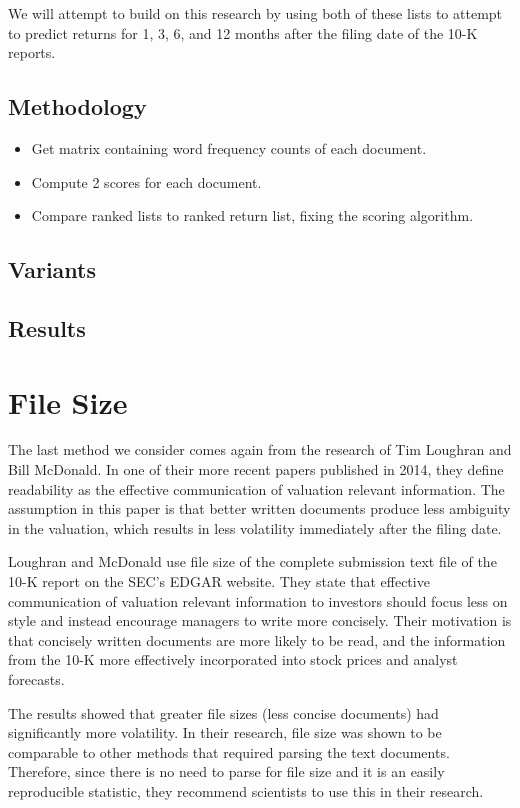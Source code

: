 \documentclass[12pt]{article}
\begin{document}
We will attempt to build on this research by using both of these lists to attempt to predict returns for 1, 3, 6, and 12 months after the filing date of the 10-K reports.

\subsection{Methodology}

\begin{itemize}
	\item Get matrix containing word frequency counts of each document.
	\item Compute 2 scores for each document.
	\item Compare ranked lists to ranked return list, fixing the scoring algorithm. 
\end{itemize}	

\subsection{Variants}

\subsection{Results}

\section{File Size}

The last method we consider comes again from the research of Tim Loughran and Bill McDonald. In one of their more recent papers published in 2014, they define readability as the effective communication of valuation relevant information. The assumption in this paper is that better written documents produce less ambiguity in the valuation, which results in less volatility immediately after the filing date. 

Loughran and McDonald use file size of the complete submission text file of the 10-K report on the SEC’s EDGAR website. They state that effective communication of valuation relevant information to investors should focus less on style and instead encourage managers to write more concisely. Their motivation is that concisely written documents are more likely to be read, and the information from the 10-K more effectively incorporated into stock prices and analyst forecasts.

The results showed that greater file sizes (less concise documents) had significantly more volatility.  In their research, file size was shown to be comparable to other methods that required parsing the text documents. Therefore, since there is no need to parse for file size and it is an easily reproducible statistic, they recommend scientists to use this in their research. 
\end{document}
